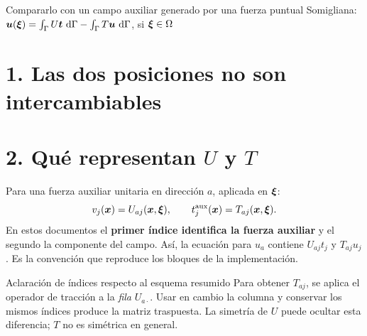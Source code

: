 \documentclass[11pt]{article}
\begin{document}
\base

{Compararlo con un campo auxiliar generado por una fuerza puntual}
{Somigliana: \(\bm{u}(\bm{\xi})=\int_\Gamma U\bm{t}\,\,\mathrm{d}\Gamma
 -\int_\Gamma T\bm{u}\,\,\mathrm{d}\Gamma\), si \(\bm{\xi}\in\Omega\)}

\section*{1. Las dos posiciones no son intercambiables}
\begin{center}
\end{center}

\section*{2. Qué representan \(U\) y \(T\)}
Para una fuerza auxiliar unitaria en dirección \(a\), aplicada en
\(\bm{\xi}\):
\[
 v_j(\bm{x})=U_{aj}(\bm{x},\bm{\xi}),\qquad
 t_j^{\mathrm{aux}}(\bm{x})=T_{aj}(\bm{x},\bm{\xi}).
\]
En estos documentos el \textbf{primer índice identifica la fuerza auxiliar}
y el segundo la componente del campo. Así, la ecuación para \(u_a\)
contiene \(U_{aj}t_j\) y \(T_{aj}u_j\).
Es la convención que reproduce los bloques de la implementación.

\begin{alerta}{Aclaración de índices respecto al esquema resumido}
Para obtener \(T_{aj}\), se aplica el operador de tracción a la
\emph{fila} \(U_{a\cdot}\). Usar en cambio la columna y conservar los mismos
índices produce la matriz traspuesta. La simetría de \(U\) puede ocultar
esta diferencia; \(T\) no es simétrica en general.
\end{alerta}
\end{document}
